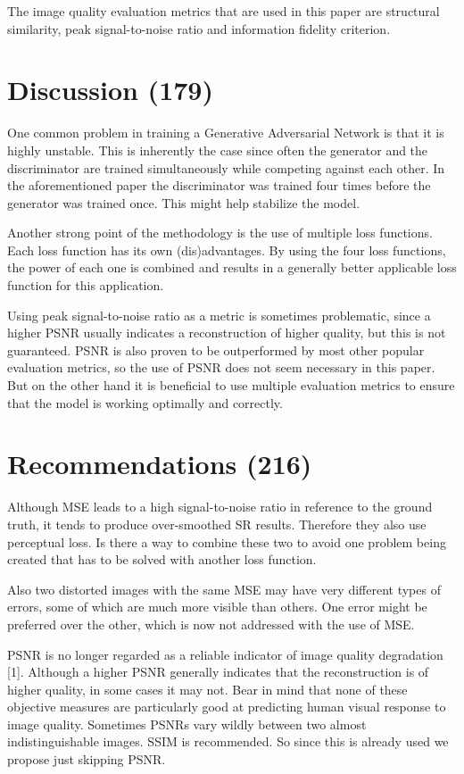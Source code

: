 \documentclass[conference]{IEEEtran}
\begin{document}
The image quality evaluation metrics that are used in this paper are structural
similarity, peak signal-to-noise ratio and information fidelity criterion.

\section{Discussion (179)}
One common problem in training a Generative Adversarial Network is that it is
highly unstable. This is inherently the case since often the generator and the
discriminator are trained simultaneously while competing against each other. In
the aforementioned paper the discriminator was trained four times before the
generator was trained once. This might help stabilize the model.

Another strong point of the methodology is the use of multiple loss functions.
Each loss function has its own (dis)advantages. By using the four loss
functions, the power of each one is combined and results in a generally better
applicable loss function for this application.

Using peak signal-to-noise ratio as a metric is sometimes problematic, since a
higher PSNR usually indicates a reconstruction of higher quality, but this is
not guaranteed. PSNR is also proven to be outperformed by most other popular
evaluation metrics, so the use of PSNR does not seem necessary in this paper.
But on the other hand it is beneficial to use multiple evaluation metrics to
ensure that the model is working optimally and correctly.

\section{Recommendations (216)}
Although MSE leads to a high signal-to-noise ratio in reference to the ground
truth, it tends to produce over-smoothed SR results. Therefore they also use
perceptual loss. Is there a way to combine these two to avoid one problem being
created that has to be solved with another loss function.

Also two distorted images with the same MSE may have very different types of
errors, some of which are much more visible than others. One error might be
preferred over the other, which is now not addressed with the use of MSE.

PSNR is no longer regarded as a reliable indicator of image quality degradation
[1]. Although a higher PSNR generally indicates that the reconstruction is of
higher quality, in some cases it may not. Bear in mind that none of these
objective measures are particularly good at predicting human visual response to
image quality. Sometimes PSNRs vary wildly between two almost indistinguishable
images. SSIM is recommended. So since this is already used we propose just
skipping PSNR.
\end{document}
